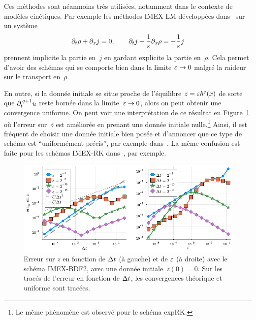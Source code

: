 Ces méthodes sont néanmoins très utilisées, notamment dans le contexte de modèles cinétiques. Par exemple les méthodes IMEX-LM développées dans~\cite{lemou.2008.new,boscarino.2017.unified,albi.2020.implicit} sur un système 
\begin{equation*}
    \partial_t \rho + \partial_x j = 0, \qquad 
    \partial_t j + \frac{1}{\varepsilon} \partial_x \rho = -\frac{1}{\varepsilon}j 
\end{equation*}
prennent implicite la partie en~$j$ en gardant explicite la partie en~$\rho$. Cela permet d'avoir des schémas qui se comporte bien dans la limite $\varepsilon \rightarrow 0$ malgré la raideur sur le transport en~$\rho$. 

En outre, si la donnée initiale se situe proche de l'équilibre $z = \varepsilon h^{\varepsilon}(x)$ de sorte que $\partial_t^{\: q+1} u$ reste bornée dans la limite~$\varepsilon \rightarrow 0$, alors on peut obtenir une convergence uniforme. On peut voir une interprétation de ce résultat en Figure~\ref{sec:intro:fig:bdf2_z0} où l'erreur sur~$z$ est améliorée en prenant une donnée initiale nulle.\footnote{Le même phénomène est observé pour le schéma expRK.} Ainsi, il est fréquent de choisir une donnée initiale bien posée et d'annoncer que ce type de schéma est \enquote{uniformément précis}, par exemple dans~\cite{jin.2000.uniformly,hu.2021.uniform}. La même confusion est faite pour les schémas IMEX-RK dans~\cite{boscarino.2009.class,boscarino.2017.unified}, par exemple. 

\begin{figure}
    \centering
    \includegraphics[width=\textwidth]{./Presentation/bdf2_err_z0.pdf}
    \caption{Erreur sur $z$ en fonction de $\Delta t$ (à gauche) et de $\varepsilon$ (à droite) avec le schéma IMEX-BDF2, avec une donnée initiale~$z(0) = 0$. Sur les tracés de l'erreur en fonction de $\Delta t$, les convergences théorique et uniforme sont tracées.}
    \label{sec:intro:fig:bdf2_z0}
\end{figure}



